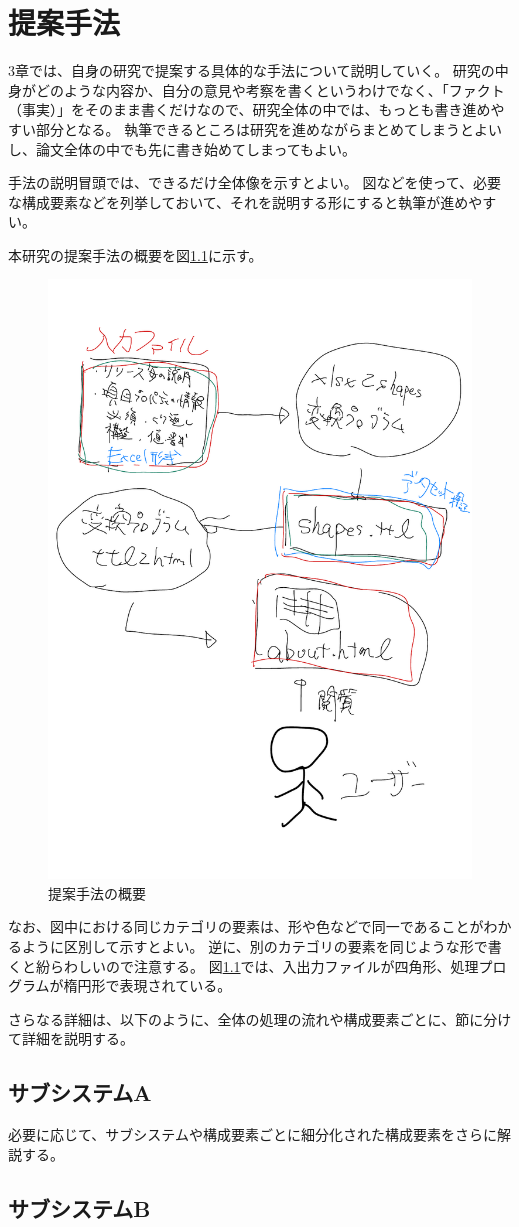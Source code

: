 \chapter{提案手法}
\label{chap:method}

3章では、自身の研究で提案する具体的な手法について説明していく。
研究の中身がどのような内容か、自分の意見や考察を書くというわけでなく、「ファクト（事実）」をそのまま書くだけなので、研究全体の中では、もっとも書き進めやすい部分となる。
執筆できるところは研究を進めながらまとめてしまうとよいし、論文全体の中でも先に書き始めてしまってもよい。

手法の説明冒頭では、できるだけ全体像を示すとよい。
図などを使って、必要な構成要素などを列挙しておいて、それを説明する形にすると執筆が進めやすい。

本研究の提案手法の概要を図\ref{fig:overview}に示す。

\begin{figure}[htb]
    \centering
    \includegraphics[width=.4\hsize]{figures/overview.pdf}
    \caption{提案手法の概要}
    \label{fig:overview}
\end{figure}

なお、図中における同じカテゴリの要素は、形や色などで同一であることがわかるように区別して示すとよい。
逆に、別のカテゴリの要素を同じような形で書くと紛らわしいので注意する。
図\ref{fig:overview}では、入出力ファイルが四角形、処理プログラムが楕円形で表現されている。

さらなる詳細は、以下のように、全体の処理の流れや構成要素ごとに、節に分けて詳細を説明する。

\section{サブシステムA}

必要に応じて、サブシステムや構成要素ごとに細分化された構成要素をさらに解説する。

\section{サブシステムB}

